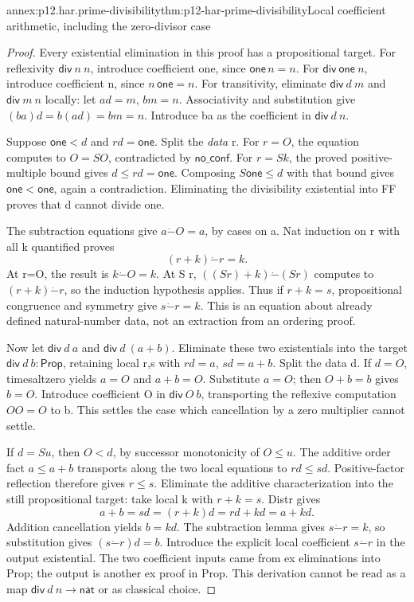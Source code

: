 \begin{annexitem}{annex:p12.har.prime-divisibility}{thm:p12-har-prime-divisibility}{Local coefficient arithmetic, including the zero-divisor case}
\begin{proof}
Every existential elimination in this proof has a propositional target.
For reflexivity \(\mathsf{div}\ n\ n\), introduce coefficient one,
since \(\mathsf{one}\,n=n\). For \(\mathsf{div}\ \mathsf{one}\ n\),
introduce coefficient n, since \(n\,\mathsf{one}=n\).
For transitivity, eliminate \(\mathsf{div}\ d\ m\) and
\(\mathsf{div}\ m\ n\) locally: let \(ad=m\), \(bm=n\).
Associativity and substitution give \((ba)d=b(ad)=bm=n\).
Introduce ba as the coefficient in \(\mathsf{div}\ d\ n\).

Suppose \(\mathsf{one}<d\) and \(rd=\mathsf{one}\).
Split the \emph{data} r. For \(r=O\), the equation computes to
\(O=S O\), contradicted by \(\mathsf{no\_conf}\). For \(r=S k\), the proved
positive-multiple bound gives \(d\le rd=\mathsf{one}\).
Composing \(S\mathsf{one}\le d\) with that bound gives
\(\mathsf{one}<\mathsf{one}\), again a contradiction. Eliminating
the divisibility existential into FF proves that d cannot divide one.

The subtraction equations give \(a\mathbin{\dot{-}}O=a\), by
cases on a. Nat induction on r with all k quantified proves
\[
 (r+k)\mathbin{\dot{-}}r=k.
\]
At r=O, the result is \(k\mathbin{\dot{-}}O=k\). At S r,
\(((S r)+k)\mathbin{\dot{-}}(S r)\) computes to
\((r+k)\mathbin{\dot{-}}r\), so the induction hypothesis applies.
Thus if \(r+k=s\), propositional congruence and symmetry give
\(s\mathbin{\dot{-}}r=k\). This is an equation about already
defined natural-number data, not an extraction from an ordering proof.

Now let \(\mathsf{div}\ d\ a\) and \(\mathsf{div}\ d\ (a+b)\).
Eliminate these two existentials into the target
\(\mathsf{div}\ d\ b:\mathsf{Prop}\), retaining local r,s with
\(rd=a\), \(sd=a+b\). Split the data d.
If \(d=O\), timesaltzero yields \(a=O\) and \(a+b=O\).
Substitute \(a=O\); then \(O+b=b\) gives \(b=O\).
Introduce coefficient O in \(\mathsf{div}\ O\ b\), transporting
the reflexive computation \(OO=O\) to b. This settles the case
which cancellation by a zero multiplier cannot settle.

If \(d=S u\), then \(O<d\), by successor monotonicity of
\(O\le u\). The additive order fact \(a\le a+b\) transports
along the two local equations to \(rd\le sd\). Positive-factor
reflection therefore gives \(r\le s\). Eliminate the additive
characterization into the still propositional target: take local k
with \(r+k=s\). Distr gives
\[
 a+b=sd=(r+k)d=rd+kd=a+kd.
\]
Addition cancellation yields \(b=kd\). The subtraction lemma gives
\(s\mathbin{\dot{-}}r=k\), so substitution gives
\((s\mathbin{\dot{-}}r)d=b\). Introduce the explicit local
coefficient \(s\mathbin{\dot{-}}r\) in the output existential.
The two coefficient inputs came from ex eliminations into Prop; the
output is another ex proof in Prop. This derivation cannot be read as
a map \(\mathsf{div}\ d\ n\to\mathsf{nat}\) or as classical choice.
\end{proof}
\end{annexitem}


